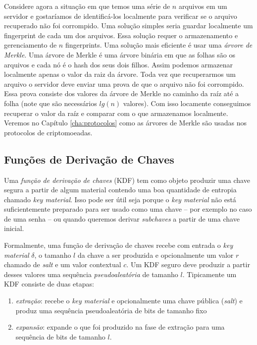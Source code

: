Considere agora a situação em que temos uma série de $n$ arquivos em um servidor e gostaríamos de identificá-los localmente para verificar se o arquivo recuperado não foi corrompido.
Uma solução simples seria guardar localmente um fingerprint de cada um dos arquivos.
Essa solução requer o armazenamento e gerenciamento de $n$ fingerprints.
Uma solução mais eficiente é usar uma {\em árvore de Merkle}.
Uma árvore de Merkle é uma árvore binária em que as folhas são os arquivos e cada nó é o hash dos seus dois filhos.
Assim podemos armazenar localmente apenas o valor da raiz da árvore.
Toda vez que recuperarmos um arquivo o servidor deve enviar uma prova de que o arquivo não foi corrompido.
Essa prova consiste dos valores da árvore de Merkle no caminho da raíz até a folha (note que são necessários $lg(n)$ valores).
Com isso locamente conseguimos recuperar o valor da raíz e comparar com o que armazenamos localmente.
Veremos no Capítulo \ref{cha:protocolos} como as árvores de Merkle são usadas nos protocolos de criptomoeadas.

\subsection{Funções de Derivação de Chaves}
\label{sec:kdf}

Uma {\em função de derivação de chaves} (KDF) tem como objeto produzir uma chave segura a partir de algum material contendo uma boa quantidade de entropia chamado {\em key material}.
Isso pode ser útil seja porque o {\em key material} não está suficientemente preparado para ser usado como uma chave -- por exemplo no caso de uma senha -- ou quando queremos derivar {\em subchaves} a partir de uma chave inicial.

Formalmente, uma função de derivação de chaves recebe com entrada o {\em key material} $\delta$, o tamanho $l$ da chave a ser produzida e opcionalmente um valor $r$ chamado de {\em salt} e um valor contextual $c$.
Um KDF seguro deve produzir a partir desses valores uma sequência {\em pseudoaleatória} de tamanho $l$.
Tipicamente um KDF consiste de duas etapas: 
\begin{enumerate}
\item {\em extração}: recebe o {\em key material} e opcionalmente uma chave pública ({\em salt}) e produz uma sequência pseudoaleatória de bits de tamanho fixo
\item {\em expansão}: expande o que foi produzido na fase de extração para uma sequência de bits de tamanho $l$.
\end{enumerate}

